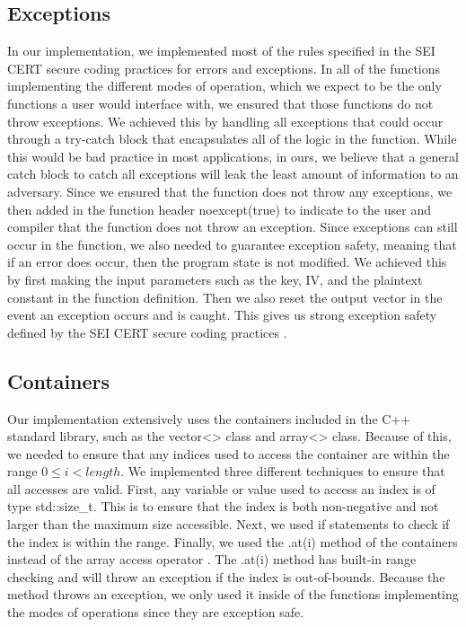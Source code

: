 \documentclass[a4paper,12pt]{article}
\begin{document}
\subsection{Exceptions}
In our implementation, we implemented most of the rules specified in the SEI CERT secure coding practices for errors and exceptions. In all of the functions implementing the different modes of operation, which we expect to be the only functions a user would interface with, we ensured that those functions do not throw exceptions. We achieved this by handling all exceptions that could occur through a try-catch block that encapsulates all of the logic in the function. While this would be bad practice in most applications, in ours, we believe that a general catch block to catch all exceptions will leak the least amount of information to an adversary. Since we ensured that the function does not throw any exceptions, we then added in the function header {\selectfont noexcept(true)} to indicate to the user and compiler that the function does not throw an exception. Since exceptions can still occur in the function, we also needed to guarantee exception safety, meaning that if an error does occur, then the program state is not modified. We achieved this by first making the input parameters such as the key, IV, and the plaintext constant in the function definition. Then we also reset the output vector in the event an exception occurs and is caught. This gives us strong exception safety defined by the SEI CERT secure coding practices \cite{SEI CERT}.

\subsection{Containers}
Our implementation extensively uses the containers included in the C++ standard library, such as the {\selectfont vector<>} class and {\selectfont array<>} class. Because of this, we needed to ensure that any indices used to access the container are within the range $0 \leq i < length$. We implemented three different techniques to ensure that all accesses are valid. First, any variable or value used to access an index is of type {\selectfont std::size\_t}. This is to ensure that the index is both non-negative and not larger than the maximum size accessible. Next, we used if statements to check if the index is within the range. Finally, we used the {\selectfont .at(i)} method of the containers instead of the array access operator {\selectfont []}. The {\selectfont .at(i)} method has built-in range checking and will throw an exception if the index is out-of-bounds. Because the method throws an exception, we only used it inside of the functions implementing the modes of operations since they are exception safe.
\end{document}
